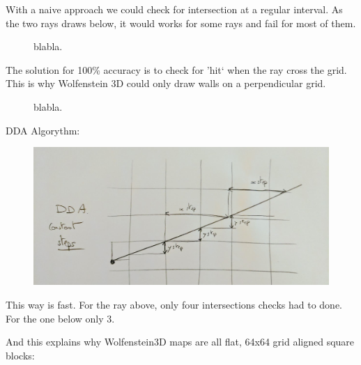 With a naive approach we could check for intersection at a regular interval. As the two rays draws below, it would works for some rays and fail for most of them.
\begin{figure}[H]
\centering
 
 \caption{blabla.}
\end{figure}

The solution for 100\% accuracy is to check for 'hit` when the ray cross the grid. This is why Wolfenstein 3D could only draw walls on a perpendicular grid.
\begin{figure}[H]
\centering
 
 \caption{blabla.}
\end{figure}
\par
DDA Algorythm:
 \par
\begin{figure}[H]
  \centering
 \includegraphics[width=\textwidth]{imgs/dda_explainer.png}
\end{figure}
\par

This way is fast. For the ray above, only four intersections checks had to done. For the one below only 3.\\
\par
And this explains why Wolfenstein3D maps are all flat, 64x64 grid aligned square blocks:\\
\par

